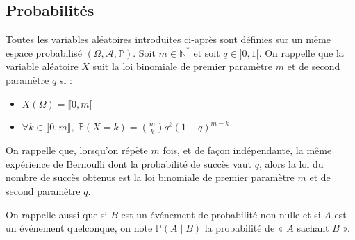 \documentclass{article}
\begin{document}
    \subsection{Probabilités}

Toutes les variables aléatoires introduites ci-après sont définies sur un même espace probabilisé $(\Omega, \mathcal{A}, \mathbb{P})$. Soit $m \in \mathbb{N}^*$ et soit $q \in ]0,1[$. On rappelle que la variable aléatoire $X$ suit la loi binomiale de premier paramètre $m$ et de second paramètre $q$ si :
\begin{itemize}
    \item $X(\Omega) = \llbracket 0,m \rrbracket$
    \item $\forall k \in \llbracket 0,m \rrbracket,\ \mathbb{P}(X = k) = \binom{m}{k} q^k (1-q)^{m-k}$
\end{itemize}

On rappelle que, lorsqu'on répète $m$ fois, et de façon indépendante, la même expérience de Bernoulli dont la probabilité de succès vaut $q$, alors la loi du nombre de succès obtenus est la loi binomiale de premier paramètre $m$ et de second paramètre $q$.

On rappelle aussi que si $B$ est un événement de probabilité non nulle et si $A$ est un événement quelconque, on note $\mathbb{P}(A \mid B)$ la probabilité de « $A$ sachant $B$ ».
\end{document}
